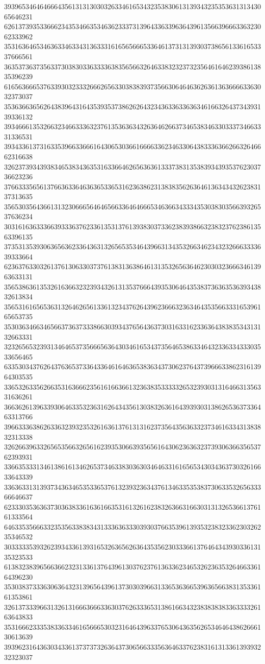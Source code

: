 39396534646466643561313130303263346165343235383061313934323535363131343065646231
62613739353366623435346635346362333731396433633963643961356639666336323062333962
35316364653463633463343136333161656566653364613731313930373865613361653337666561
36353736373563373038303363333638356566326463383232373235646164623938613835396239
61656366653763393032333266626563303838393735663064646362636136366663363032373037
35363663656264383964316435393537386262643234363363363634616632643734393139336132
39346661353266323466333632376135363634326364626637346538346330333734663331336531
39343361373163353966336661643065303661666633623463306438333636626632646662316638
32623739343938346538343635316336646265636361333738313538393439353762303736623236
37663335656137663633646363653365316236386231383835626364613634343262383137313635
35653035643661313230666564646566336464666534636634333435303830356639326537636234
30316163633366393336376233613531376139383037336238393866323832376238613563396135
37353135393063656362336436313265653534643966313435326634623432326663333639333664
62363763303261376130633037376138313638646131353265636462303032366634613963633131
35653863613532616366323239343261313537666439353064643538373636353639343832613834
35653161656536313264626561336132343762643962366632363464353566333165396165653735
35303634663465663736373338663039343765643637303163316233636438383534313132663331
32326565323931346465373566656364303461653437356465386334643233633433303533656465
63353034376264376365373364336461646365383634373062376437396663386231613964303535
33653263356266353163666235616166366132363835333332653239303131646631356331636261
36636261396339306463353236316264343561303832636164393930313862653637336463313766
39663336386263363239323532616361376131316237356435636332373461633431383832313338
32626639633265653566326561623935306639356561643062363632373930636635653762393931
33663533313461386161346265373463383036303464633161656534303436373032616633643339
33636331313937343634653533653761323932363437613463353538373063353265633366646637
62333035363637303638336163616635316132616238326366316630313132653661376161333564
64633535666332353563383834313336363330393037663539613935323832336230326235346532
30333335393262393433613931653263656263643535623033366137646434393033613135323533
61383238396566366232313361376439613037623761363362346532623635326466336164396230
35303837333630636432313965643961373030396631336536366539636566383135336161353861
32613733396631326131666366633630376263336531386166343238383838336333326163643833
35316662333538336334616566653032316464396337653064363562653464643862666130613639
39396231643630343361373737326364373065663335636463376238316131336139393232323037

